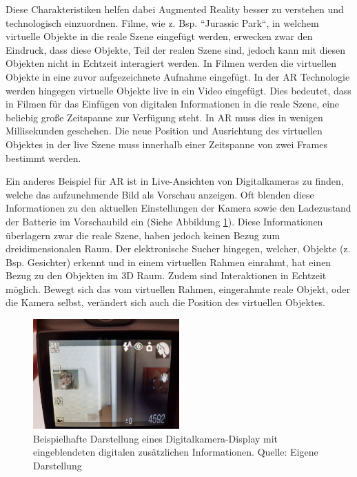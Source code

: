 Diese Charakteristiken helfen dabei Augmented Reality besser zu verstehen und technologisch einzuordnen. \cite{Azuma1997} Filme, wie z. Bsp. ``Jurassic Park``, in welchem virtuelle Objekte in die reale Szene eingefügt werden, erwecken zwar den Eindruck, dass diese Objekte, Teil der realen Szene sind, jedoch kann mit diesen Objekten nicht in Echtzeit interagiert werden. \cite{Tonnis2010} In Filmen werden die virtuellen Objekte in eine zuvor aufgezeichnete Aufnahme eingefügt. 
In der AR Technologie werden hingegen virtuelle Objekte live in ein Video eingefügt. Dies bedeutet, dass in  Filmen für das Einfügen von digitalen Informationen in die reale Szene, eine beliebig große Zeitspanne zur Verfügung steht. 
In AR muss dies in wenigen Millisekunden geschehen. Die neue Position und Ausrichtung des virtuellen Objektes in der live Szene muss innerhalb einer Zeitspanne von zwei Frames bestimmt werden.

Ein anderes Beispiel für AR ist in Live-Ansichten von Digitalkameras zu finden, welche das aufzunehmende Bild als Vorschau anzeigen. Oft blenden diese Informationen zu den aktuellen Einstellungen der Kamera sowie den 
Ladezustand der Batterie im Vorschaubild ein (Siehe Abbildung \ref{img:ar_camera_example}). Diese Informationen überlagern zwar die reale Szene, haben jedoch keinen Bezug zum dreidimensionalen Raum. 
Der elektronische Sucher hingegen, welcher, Objekte (z. Bsp. Gesichter) erkennt und in einem virtuellen Rahmen einrahmt, hat einen Bezug zu den Objekten im 3D Raum. 
Zudem sind Interaktionen in Echtzeit möglich. Bewegt sich das vom virtuellen Rahmen, eingerahmte reale Objekt, oder die Kamera selbst, verändert sich auch die Position des virtuellen Objektes. 

\begin{figure}
	\centering
	\includegraphics[width=0.50\textwidth]{resources/fundamentals/example_camera_screen_ar}
	\caption{Beispielhafte Darstellung eines Digitalkamera-Display mit eingeblendeten digitalen zusätzlichen Informationen. Quelle: Eigene Darstellung}
	\label{img:ar_camera_example}
\end{figure}

